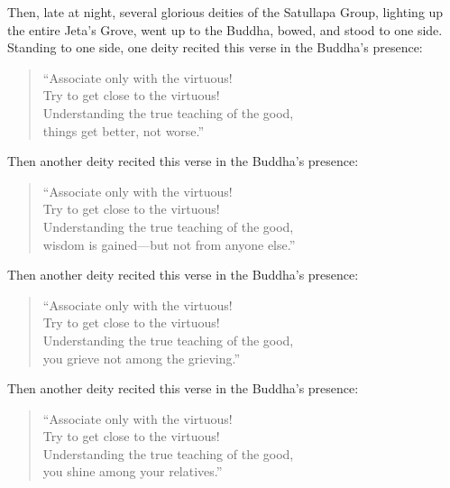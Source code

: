 \documentclass[12pt,openany]{book}%
\begin{document}
Then, late at night, several glorious deities of the Satullapa Group, lighting up the entire Jeta’s Grove, went up to the Buddha, bowed, and stood to one side. Standing to one side, one deity recited this verse in the Buddha’s presence: 

\begin{verse}%
“Associate only with the virtuous! \\
Try to get close to the virtuous! \\
Understanding the true teaching of the good, \\
things get better, not worse.” 

%
\end{verse}

Then another deity recited this verse in the Buddha’s presence: 

\begin{verse}%
“Associate only with the virtuous! \\
Try to get close to the virtuous! \\
Understanding the true teaching of the good, \\
wisdom is gained—but not from anyone else.” 

%
\end{verse}

Then another deity recited this verse in the Buddha’s presence: 

\begin{verse}%
“Associate only with the virtuous! \\
Try to get close to the virtuous! \\
Understanding the true teaching of the good, \\
you grieve not among the grieving.” 

%
\end{verse}

Then another deity recited this verse in the Buddha’s presence: 

\begin{verse}%
“Associate only with the virtuous! \\
Try to get close to the virtuous! \\
Understanding the true teaching of the good, \\
you shine among your relatives.” 

%
\end{verse}
\end{document}
